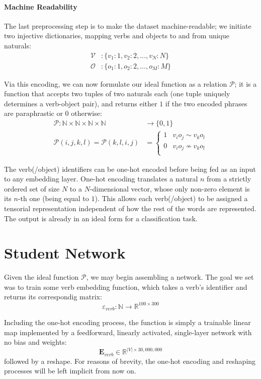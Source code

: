 \documentclass[a4paper,11pt]{article}
\newcommand{\abs}[1]{\lvert #1\rvert}
\begin{document}
\paragraph{Machine Readability}
The last preprocessing step is to make the dataset machine-readable; we initiate two injective dictionaries, mapping verbs and objects to and from unique naturals:
\begin{align*}
	\mathcal{V}&: \{v_1: 1, v_2: 2, ..., v_N: N\}\\
	\mathcal{O}&: \{o_1: 1, o_2: 2, ..., o_M: M\}
\end{align*}

Via this encoding, we can now formulate our ideal function as a relation $\mathcal{P}$; it is a function that accepts two tuples of two naturals each (one tuple uniquely determines a verb-object pair), and returns either $1$ if the two encoded phrases are paraphrastic or $0$ otherwise:
\begin{align*}
\mathcal{P}: \mathbb{N} \times \mathbb{N} \times \mathbb{N} \times \mathbb{N} &\to \{0, 1\}\\
	\mathcal{P}(i,j,k,l) = \mathcal{P}(k,l,i,j)
	 &= \begin{cases}
	1 & v_i o_j \sim v_k o_l\\
	0 & v_i o_j \nsim v_k o_l\\
	\end{cases}
\end{align*}

The verb(/object) identifiers can be one-hot encoded before being fed as an input to any embedding layer. One-hot encoding translates a natural $n$ from a strictly ordered set of size $N$ to a $N$-dimensional vector, whose only non-zero element is its $n$-th one (being equal to $1$). This allows each verb(/object) to be assigned a tensorial representation independent of how the rest of the words are represented. The output is already in an ideal form for a classification task.

\section{Student Network}
Given the ideal function $\mathcal{P}$, we may begin assembling a network. The goal we set was to train some verb embedding function, which takes a verb's identifier and returns its correspondig matrix:
 \[\varepsilon_{verb}: \mathbb{N} \to \mathbb{R}^{100 \times 300}\]

Including the one-hot encoding process, the function is simply a trainable linear map implemented by a feedforward, linearly activated, single-layer network with no bias and weights:
\[
\mathbf{E}_{verb}  \in \mathbb{R}^{\abs{V} \times 30,000,000}
\]
followed by a reshape. For reasons of brevity, the one-hot encoding and reshaping processes will be left implicit from now on.
\end{document}
